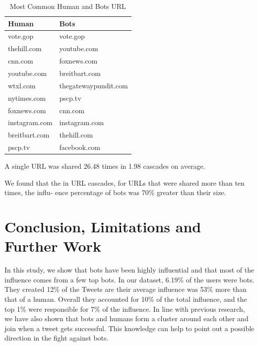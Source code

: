 \documentclass[letterpaper]{article}
\begin{document}
\begin{table}[H]
    \centering
    \begin{tabular}{|l|l|}
    \hline
    \textbf{Human} & \textbf{Bots} \\ \hline
    vote.gop & vote.gop \\ \hline
    thehill.com & youtube.com \\ \hline
    cnn.com & foxnews.com \\ \hline
    youtube.com & breitbart.com \\ \hline
    wtxl.com & thegatewaypundit.com \\ \hline
    nytimes.com & pscp.tv \\ \hline
    foxnews.com & cnn.com \\ \hline
    instagram.com & instagram.com \\ \hline
    breitbart.com & thehill.com \\ \hline
    pscp.tv & facebook.com \\ \hline
    \end{tabular}
    \caption{Most Common Human and Bots URL}
    \label{tab:common_human_bots}
\end{table}

A single URL was shared 26.48 times in 1.98 cascades on average.

We found that the in URL cascades, for URLs that were shared more than ten times, the influ-
ence percentage of bots was 70\% greater than their size.

\section{Conclusion, Limitations and Further Work}
In this study, we show that bots have been highly influential and that most of the influence comes from a few top 
bots. In our dataset, 6.19\% of the users were bots. They created 12\% of the Tweets are their average influence was 
53\% more than that of a human. Overall they accounted for 10\% of the total influence, and the top 1\% were 
responsible for 7\% of the influence. In line with previous research, we have also shown that bots 
and humans form a cluster around each other and join when a tweet gets successful. This knowledge can help to point
 out a possible direction in the fight against bots. 
\end{document}
